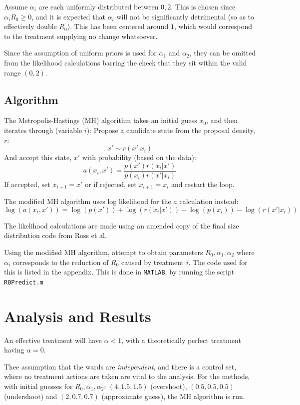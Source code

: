 \documentclass{X:/Documents/Coding/Latex/myassignment}
\begin{document}
Assume $\alpha_i$ are each uniformly distributed between $0,2$. This is chosen since $\alpha_i R_0 \geq 0$, and it is expected that $\alpha_i$ will not be significantly detrimental (so as to effectively double $R_0$). This has been centered around $1$, which would correspond to the treatment supplying no change whatsoever.

Since the assumption of uniform priors is used for $\alpha_1$ and $\alpha_2$, they can be omitted from the likelihood calculations barring the check that they sit within the valid range $(0,2)$.


\subsection{Algorithm}
The Metropolis-Hastings (MH) algorithm takes an initial guess $x_0$, and then iterates through (variable $i$):
Propose a candidate state from the proposal density, $r$:
\[x' \sim r(x'|x_i)\]
And accept this state, $x'$ with probability (based on the data):
\[a(x_i,x') = \frac{p(x')r(x_i|x')}{p(x_i)r(x'|x_i)}\]
If accepted, set $x_{i+1} = x'$ or if rejected, set $x_{i+1} = x_i$ and restart the loop. 

The modified MH algorithm uses log likelihood for the $a$ calculation instead:
\[\log(a(x_i,x')) = \log(p(x')) + \log(r(x_i|x')) - \log(p(x_i)) - \log(r(x'|x_i)) \]

The likelihood calculations are made using an amended copy of the final size distribution code from Ross et al\parencite{BLACK2015159}.

Using the modified MH algorithm, attempt to obtain parameters $R_0, \alpha_1, \alpha_2$ where $\alpha_i$ corresponds to the reduction of $R_0$ caused by treatment $i$. The code used for this is listed in the appendix.
This is done in \verb|MATLAB|, by running the script \verb|R0Predict.m|











\section{Analysis and Results}
 An effective treatment will have $\alpha < 1$, with a theoretically perfect treatment having $\alpha = 0$.  

Thee assumption that the wards are \emph{independent}, and there is a control set, where no treatment actions are taken are vital to the analysis. 
For the methods, with initial guesses for $R_0,\alpha_1,\alpha_2$: $(4,1.5,1.5)$ (overshoot), $(0.5,0.5,0.5)$ (undershoot) and $(2,0.7,0.7)$ (approximate guess), the MH algorithm is run. 
\end{document}
